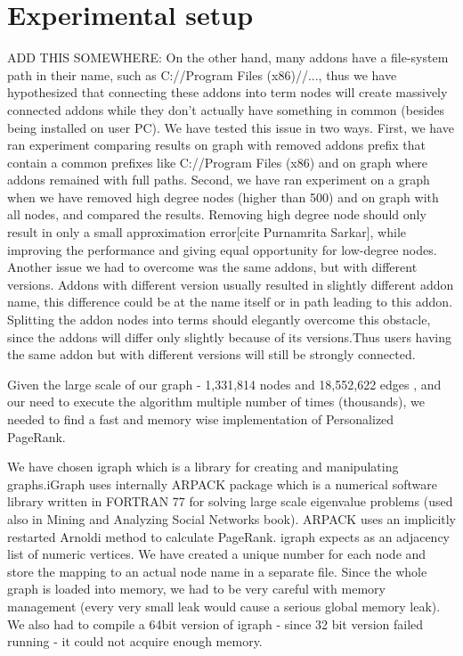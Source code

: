 \documentclass[11pt,oneside]{book}
\let\Oldsection\section
\renewcommand{\section}{\FloatBarrier\Oldsection}
\begin{document}
\section{Experimental setup}

ADD THIS SOMEWHERE: On the other hand, many addons have a file-system path in their name, such as C://Program Files (x86)//..., thus we have hypothesized that connecting these addons into term nodes will create massively connected addons while they don't actually have something in common (besides being installed on user PC). We have tested this issue in two ways. First, we have ran experiment comparing results on graph with removed addons prefix that contain a common prefixes like C://Program Files (x86) and on graph where addons remained with full paths. Second, we have ran experiment on a graph when we have removed high degree nodes (higher than 500) and on graph with all nodes, and compared the results. Removing high degree node should only result in only a small approximation error[cite Purnamrita Sarkar], while improving the performance and giving equal opportunity for low-degree nodes.
Another issue we had to overcome was the same addons, but with different versions. Addons with different version usually resulted in slightly different addon name, this difference could be at the name itself or in path leading to this addon. Splitting the addon nodes into terms should elegantly overcome this obstacle, since the addons will differ only slightly because of its versions.Thus users having the same addon but with different versions will still be strongly connected.


Given the large scale of our graph - 1,331,814 nodes and 18,552,622 edges , and our need to execute the algorithm multiple number of times (thousands), we needed to find a fast and memory wise implementation of Personalized PageRank.

We have chosen igraph \citep{igraph} which is a library for creating and manipulating graphs.iGraph uses internally ARPACK package which is a numerical software library written in FORTRAN 77 for solving large scale eigenvalue problems (used also in Mining and Analyzing Social Networks book). ARPACK uses an implicitly restarted Arnoldi method to calculate PageRank. igraph expects as an adjacency list of numeric vertices. We have created a unique number for each node and store the mapping to an actual node name in a separate file. Since the whole graph is loaded into memory, we had to be very careful with memory management (every very small leak would cause a serious global memory leak). We also had to compile a 64bit version of igraph - since 32 bit version failed running - it could not acquire enough memory.
\end{document}
